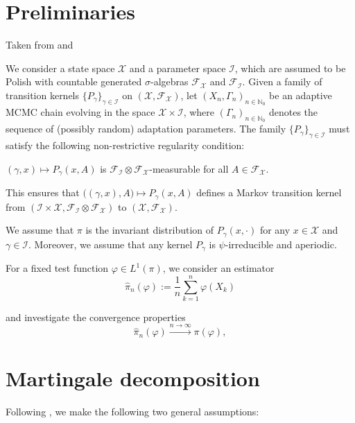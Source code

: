 

\section{Preliminaries}
\label{sec:preliminaries}

Taken from \cite{hofstadler2024sureconvergenceratesadaptive} and \cite{laitinen2024invitationadaptivemarkovchain}

We consider a state space $\mathcal{X} $ and a parameter space $\mathcal{I}$, which are assumed to be Polish with countable generated $\sigma$-algebras $\mathcal{F}_{\mathcal{X}}$ and $\mathcal{F}_{\mathcal{I}}$.  
Given a family of transition kernels $\{ {P}_\gamma \}_{\gamma \in \mathcal{I}}$ on $(\mathcal{X}, \mathcal{F}_{\mathcal{X}})$, let  $(X_n, \Gamma_n)_{n \in \mathbb{N}_0}$ be an adaptive MCMC chain evolving in the space $\mathcal{X} \times \mathcal{I}$, where $(\Gamma_n)_{n \in \mathbb{N}_0}$ denotes the sequence of (possibly random) adaptation parameters.
The family $\{P_\gamma\}_{\gamma\in\mathcal{I}}$ must satisfy the following non-restrictive regularity condition: 
\begin{assumption}[Regularity]
    \label{a:regularity}
        $(\gamma,x) \mapsto P_\gamma(x,A)$ is $\mathcal{F}_{\mathcal{I}} \otimes \mathcal{F}_{\mathcal{X}}$-measurable for all $A\in\mathcal{F}_{\mathcal{X}}$.
\end{assumption}
This ensures that $\big((\gamma,x), A\big) \mapsto P_\gamma(x,A)$ defines a Markov transition kernel from $(\mathcal{I}\times\mathcal{X}, \mathcal{F}_{\mathcal{I}} \otimes \mathcal{F}_{\mathcal{X}})$ to $(\mathcal{X}, \mathcal{F}_{\mathcal{X}})$.

We assume that $\pi$ is the invariant distribution of ${P}_\gamma(x, \cdot )$ for any $x \in \mathcal{X}$ and $\gamma \in \mathcal{I}$.
Moreover, we assume that any kernel $P_\gamma$ is $\psi$-irreducible and aperiodic.

For a fixed test function $\varphi\in L^1(\pi)$, we consider an estimator 
\begin{equation}
\label{eq:pi-hat}
    \widehat{\pi}_n(\varphi) := \frac{1}{n}\sum_{k=1}^n \varphi(X_k)
\end{equation}

and investigate the convergence properties
\begin{equation}
\widehat{\pi}_n(\varphi) \xrightarrow{n\to\infty} \pi(\varphi) ,
\label{eq:lln}
\end{equation}

\section{Martingale decomposition}
Following \cite{laitinen2024invitationadaptivemarkovchain}, we make the following two general assumptions:

